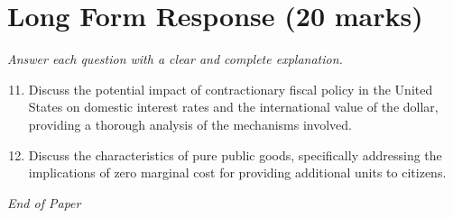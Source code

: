 \documentclass[12pt]{article}
\begin{document}
\section*{Long Form Response (20 marks)}
\textit{Answer each question with a clear and complete explanation.}
\begin{enumerate}[label=\arabic*.]
\setcounter{enumi}{10}
\item Discuss the potential impact of contractionary fiscal policy in the United States on domestic interest rates and the international value of the dollar, providing a thorough analysis of the mechanisms involved.
\item Discuss the characteristics of pure public goods, specifically addressing the implications of zero marginal cost for providing additional units to citizens.
\end{enumerate}

\vfill
\noindent\textit{End of Paper}
\end{document}
